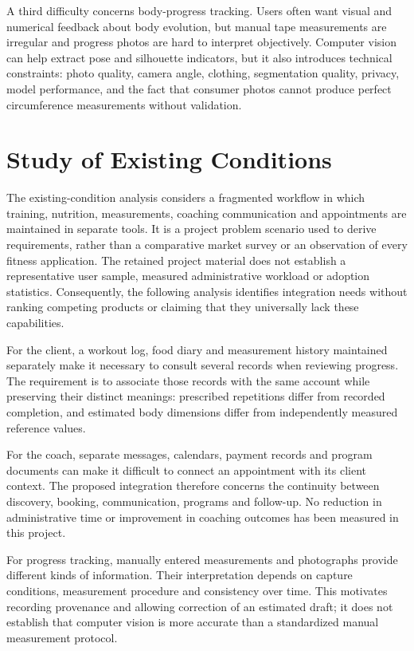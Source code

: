 \documentclass[12pt,a4paper,openany]{report}
\begin{document}
A third difficulty concerns body-progress tracking. Users often want visual and numerical feedback about body evolution, but manual tape measurements are irregular and progress photos are hard to interpret objectively. Computer vision can help extract pose and silhouette indicators, but it also introduces technical constraints: photo quality, camera angle, clothing, segmentation quality, privacy, model performance, and the fact that consumer photos cannot produce perfect circumference measurements without validation.


\section{Study of Existing Conditions}


The existing-condition analysis considers a fragmented workflow in which training, nutrition, measurements, coaching communication and appointments are maintained in separate tools. It is a project problem scenario used to derive requirements, rather than a comparative market survey or an observation of every fitness application. The retained project material does not establish a representative user sample, measured administrative workload or adoption statistics. Consequently, the following analysis identifies integration needs without ranking competing products or claiming that they universally lack these capabilities.

For the client, a workout log, food diary and measurement history maintained separately make it necessary to consult several records when reviewing progress. The requirement is to associate those records with the same account while preserving their distinct meanings: prescribed repetitions differ from recorded completion, and estimated body dimensions differ from independently measured reference values.

For the coach, separate messages, calendars, payment records and program documents can make it difficult to connect an appointment with its client context. The proposed integration therefore concerns the continuity between discovery, booking, communication, programs and follow-up. No reduction in administrative time or improvement in coaching outcomes has been measured in this project.

For progress tracking, manually entered measurements and photographs provide different kinds of information. Their interpretation depends on capture conditions, measurement procedure and consistency over time. This motivates recording provenance and allowing correction of an estimated draft; it does not establish that computer vision is more accurate than a standardized manual measurement protocol.
\end{document}
